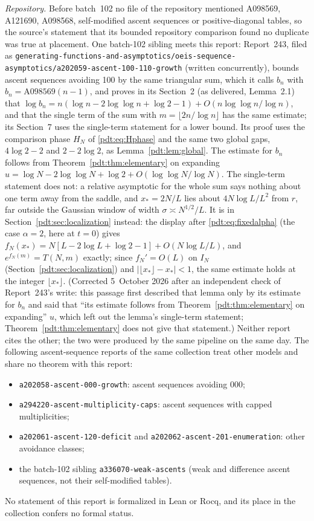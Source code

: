 \begin{writenote}
\emph{Repository.} Before batch~102 no file of the repository mentioned
A098569, A121690, A098568, self-modified ascent sequences or positive-diagonal
tables, so the source's statement that its bounded repository comparison
found no duplicate was true at placement. One batch-102 sibling meets this
report: Report~243, filed as
\nolinkurl{generating-functions-and-asymptotics/oeis-sequence-asymptotics/a202059-ascent-100-110-growth}
(written concurrently), bounds ascent sequences avoiding 100 by the same
triangular sum, which it calls $b_n$ with $b_n=\mathrm{A098569}(n-1)$, and
proves in its Section~2 (as delivered, Lemma~2.1) that
$\log b_n=n(\log n-2\log\log n+\log2-1)+O(n\log\log n/\log n)$, and that
the single term of the sum with $m=\lfloor2n/\log n\rfloor$ has the same
estimate; its Section~7 uses the single-term statement for a lower bound.
Its proof uses
the comparison phase $H_N$ of \eqref{pdt:eq:Hphase} and the same two global
gaps, $4\log2-2$ and $2-2\log2$, as Lemma~\ref{pdt:lem:global}. The
estimate for $b_n$ follows from Theorem~\ref{pdt:thm:elementary} on expanding
$u=\log N-2\log\log N+\log2+O(\log\log N/\log N)$. The single-term
statement does not: a relative asymptotic for the whole sum says nothing
about one term away from the saddle, and $x_*=2N/L$ lies about
$4N\log L/L^2$ from $r$, far outside the Gaussian window of width
$\sigma\asymp N^{1/2}/L$. It is in Section~\ref{pdt:sec:localization}
instead: the display after \eqref{pdt:eq:fixedalpha} (the case
$\alpha=2$, here at $t=0$) gives
$f_N(x_*)=N[L-2\log L+\log2-1]+O(N\log L/L)$, and $e^{f_N(m)}=T(N,m)$
exactly; since $f_N'=O(L)$ on $I_N$ (Section~\ref{pdt:sec:localization})
and $|\lfloor x_*\rfloor-x_*|<1$, the same estimate holds at the integer
$\lfloor x_*\rfloor$. (Corrected 5~October 2026 after an independent
check of Report~243's write: this passage first described that lemma
only by its estimate for $b_n$ and said that ``its estimate follows from
Theorem~\ref{pdt:thm:elementary} on expanding'' $u$, which left out the
lemma's single-term statement; Theorem~\ref{pdt:thm:elementary} does not
give that statement.) Neither report cites the
other; the two were produced by the same pipeline on the same day. The
following ascent-sequence reports of the same collection treat other models
and share no theorem with this report:
\begin{itemize}
\item \nolinkurl{a202058-ascent-000-growth}: ascent sequences avoiding 000;
\item \nolinkurl{a294220-ascent-multiplicity-caps}: ascent sequences with
 capped multiplicities;
\item \nolinkurl{a202061-ascent-120-deficit} and
 \nolinkurl{a202062-ascent-201-enumeration}: other avoidance classes;
\item the batch-102 sibling \nolinkurl{a336070-weak-ascents} (weak and
 difference ascent sequences, not their self-modified tables).
\end{itemize}
No statement of this report is formalized in Lean or Rocq, and its place
in the collection confers no formal status.


\end{writenote}
